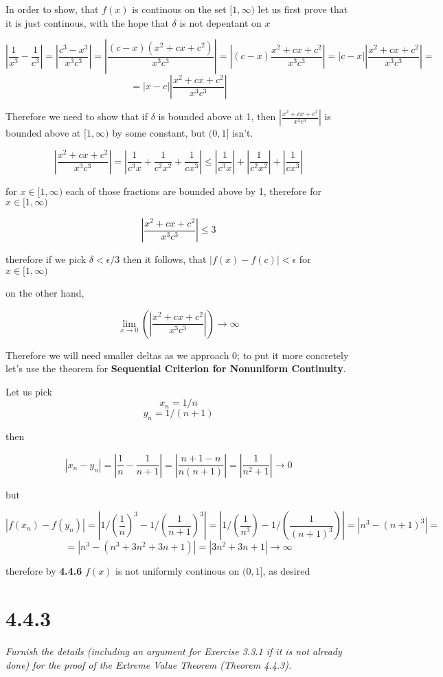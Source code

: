 \documentclass[11pt,oneside,titlepage]{article}
\begin{document}
In order to show, that $f(x)$ is continous on the set $[1, \infty)$ let us
first prove that it is just continous, with the hope that $\delta$ is not
depentant on $x$

$$ |\frac{1}{x^3} - \frac{1}{c^3}| = |\frac{c^3 - x^3}{x^3c^3}| =
|\frac{(c - x)(x^2 + cx + c^2)}{x^3c^3}|
= |(c - x) \frac{x^2 + cx + c^2}{x^3c^3}| =
|c - x||\frac{x^2 + cx + c^2}{x^3c^3}| =$$
$$ = |x - c||\frac{x^2 + cx + c^2}{x^3c^3}| $$

Therefore we need to show that if $\delta$ is bounded above at 1, then
$|\frac{x^2 + cx + c^2}{x^3c^3}|$ is bounded above at $[1, \infty)$ by
some constant, but  $(0, 1]$ isn't.

$$ |\frac{x^2 + cx + c^2}{x^3c^3}| = |\frac{1}{c^3 x} + \frac{1}{c^2x^2}
+ \frac{1}{cx^3}| \leq
|\frac{1}{c^3 x}| + |\frac{1}{c^2x^2}| + |\frac{1}{cx^3}|
$$

for $x \in [1, \infty)$ each of those fractions are bounded above by 1,
therefore for $x \in [1, \infty)$

$$ |\frac{x^2 + cx + c^2}{x^3c^3}| \leq 3 $$

therefore if we pick $\delta < \epsilon / 3 $ then it follows, that
$|f(x) - f(c)| < \epsilon$ for $x \in [1, \infty)$

on the other hand,

$$ \lim_{x \to 0}(|\frac{x^2 + cx + c^2}{x^3c^3}|) \to \infty  $$

Therefore we will need smaller deltas as we approach 0; to put it more
concretely let's use the theorem for
\textbf{Sequential Criterion for Nonuniform Continuity}.

Let us pick
$$x_n = 1/n$$
$$y_n = 1/(n + 1)$$

then

$$|x_n - y_n| = |\frac{1}{n} - \frac{1}{n + 1}| = |\frac{n + 1 - n}{n(n + 1)}|
= |\frac{1}{n ^ 2 + 1}| \to 0$$

but

$$ |f(x_n) - f(y_n)| = |1/(\frac{1}{n})^3 - 1/(\frac{1}{n + 1})^3| = |1/(\frac{1}{n^3}) - 1/(\frac{1}{(n + 1)^3})| =  |n^3 - (n + 1)^3| =  $$
$$ = |n^3 - (n ^ 3 + 3 n^2 + 3 n + 1)| = |3n^2 + 3n + 1| \to \infty$$

therefore by \textbf{4.4.6} $f(x)$ is not uniformly continous on $(0, 1]$, as desired

\section*{4.4.3}
\textit{Furnish the details (including an argument for Exercise 3.3.1 if it is not already done) for the proof of the Extreme Value Theorem (Theorem 4.4.3).}
\end{document}
